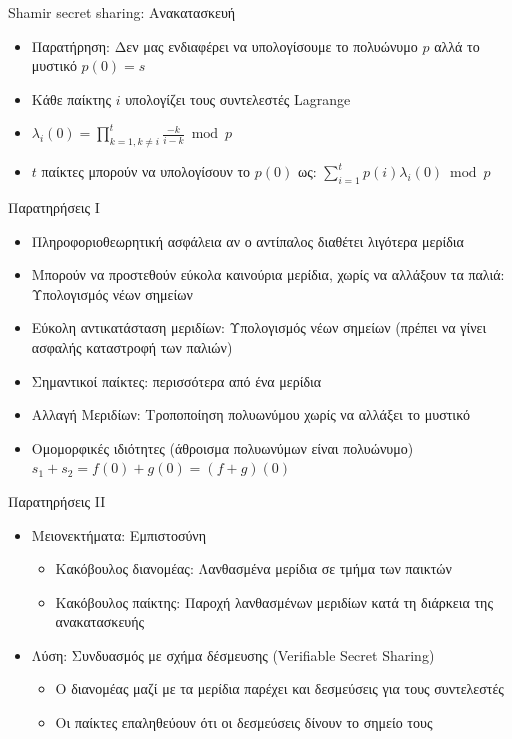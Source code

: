 \documentclass[handout]{beamer}
\begin{document}
\begin{frame}{Shamir secret sharing: Ανακατασκευή}
\begin{itemize}
\item Παρατήρηση: Δεν μας ενδιαφέρει να υπολογίσουμε το πολυώνυμο $p$ αλλά το μυστικό $p(0)=s$ \pause
\item Κάθε παίκτης $i$ υπολογίζει τους συντελεστές Lagrange \pause
\item $\lambda_i(0) = \prod_{k=1, k \neq i}^{t} \frac{-k}{i-k} \bmod{p}$ \pause
\item $t$ παίκτες μπορούν να υπολογίσουν το $p(0)$ ως: $\sum_{i=1}^{t} p(i) \lambda_i(0) \bmod{p}$
\end{itemize}
\end{frame}


\begin{frame}{Παρατηρήσεις I}
\begin{itemize}
\item Πληροφοριοθεωρητική ασφάλεια αν ο αντίπαλος διαθέτει λιγότερα μερίδια
\pause
\item Μπορούν να προστεθούν εύκολα καινούρια μερίδια, χωρίς να αλλάξουν τα παλιά: Υπολογισμός νέων σημείων
\pause
\item Εύκολη αντικατάσταση μεριδίων: Υπολογισμός νέων σημείων (πρέπει να γίνει ασφαλής καταστροφή των παλιών)
\pause
\item Σημαντικοί παίκτες: περισσότερα από ένα μερίδια
\pause
\item Αλλαγή Μεριδίων: Τροποποίηση πολυωνύμου χωρίς να αλλάξει το μυστικό
\pause
\item Ομομορφικές ιδιότητες (άθροισμα πολυωνύμων είναι πολυώνυμο) \\
$s_1 + s_2 = f(0) + g(0) = (f+g)(0)$
\end{itemize}
\end{frame}

\begin{frame}{Παρατηρήσεις II}
\begin{itemize}
\item Μειονεκτήματα: Εμπιστοσύνη \pause
\begin{itemize}
\item Κακόβουλος διανομέας: Λανθασμένα μερίδια σε τμήμα των παικτών \pause
\pause
\item Κακόβουλος παίκτης: Παροχή λανθασμένων μεριδίων κατά τη διάρκεια της ανακατασκευής \pause
\pause
\end{itemize}
\item Λύση: Συνδυασμός με σχήμα δέσμευσης (Verifiable Secret Sharing) 
\pause
\begin{itemize}
\item Ο διανομέας μαζί με τα μερίδια παρέχει και δεσμεύσεις για τους συντελεστές
\item Οι παίκτες επαληθεύουν ότι οι δεσμεύσεις δίνουν το σημείο τους
\end{itemize}
\end{itemize}
\end{frame}
\end{document}
